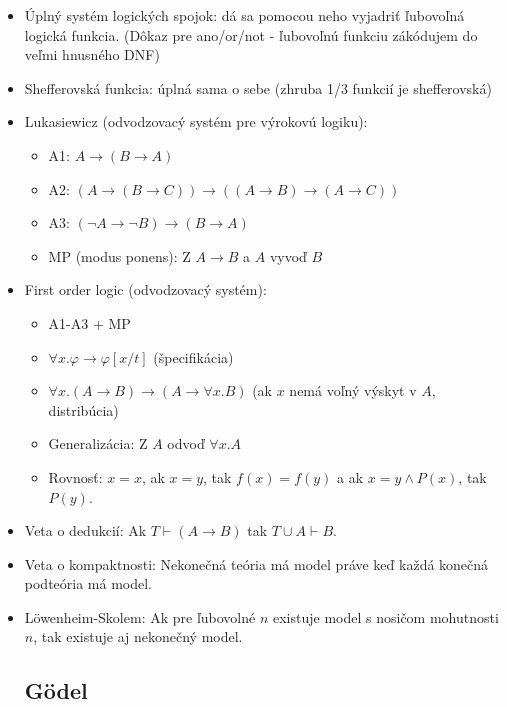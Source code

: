 \documentclass[paper=a4, fontsize=11pt]{scrartcl} %
\numberwithin{equation}{section} %
\numberwithin{figure}{section} %
\numberwithin{table}{section} %
\begin{document}
\begin{itemize}
	 \item Úplný systém logických spojok: dá sa pomocou neho vyjadriť ľubovoľná logická funkcia. (Dôkaz pre ano/or/not - ľubovoľnú funkciu zákódujem do veľmi hnusného DNF)
	 
	 \item Shefferovská funkcia: úplná sama o sebe (zhruba 1/3 funkcií je shefferovská)
	 
	 \item Lukasiewicz (odvodzovacý systém pre výrokovú logiku):
	 
	 \begin{itemize}
		\item A1: $A \to (B \to A)$
		\item A2: $(A \to (B \to C)) \to ((A \to B) \to (A \to C))$
		\item A3: $(\neg A \to \neg B ) \to (B \to A)$
		\item MP (modus ponens): Z $A \to B$ a $A$ vyvoď $B$
	 \end{itemize}

	\item First order logic (odvodzovacý systém):
	
	\begin{itemize}
		\item A1-A3 + MP
		\item $\forall x . \varphi \to \varphi[x/t]$ (špecifikácia)
		\item $\forall x. (A \to B) \to (A \to \forall x. B)$ (ak $x$ nemá voľný výskyt v $A$, distribúcia)
		\item Generalizácia: Z $A$ odvoď $\forall x . A$
		\item Rovnosť: $x = x$, ak $x = y$, tak $f(x) = f(y)$ a ak $x = y \land P(x)$, tak $P(y)$.
	\end{itemize}

	\item Veta o dedukcií: Ak $T \vdash (A \to B)$ tak $T \cup A \vdash B$.
	
	\item Veta o kompaktnosti: Nekonečná teória má model práve keď každá konečná podteória má model.
	
	\item Löwenheim-Skolem: Ak pre ľubovolné $n$ existuje model s nosičom mohutnosti $n$, tak existuje aj nekonečný model.
	
	\subsection{Gödel}
	

\end{itemize}
\end{document}
